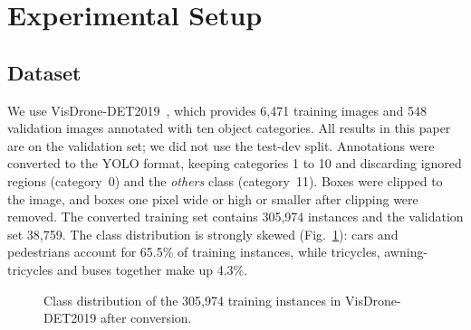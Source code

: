 \documentclass[preprint,12pt]{elsarticle}
\begin{document}
\section{Experimental Setup}
\label{sec:setup}

\subsection{Dataset}

We use VisDrone-DET2019~\cite{visdrone2019}, which provides 6,471 training images
and 548 validation images annotated with ten object categories. All results in
this paper are on the validation set; we did not use the test-dev split.
Annotations were converted to the YOLO format, keeping categories 1 to 10 and
discarding ignored regions (category~0) and the \emph{others} class (category~11).
Boxes were clipped to the image, and boxes one pixel wide or high or smaller after
clipping were removed. The converted training set contains 305,974 instances and
the validation set 38,759. The class distribution is strongly skewed
(Fig.~\ref{fig:classes}): cars and pedestrians account for 65.5\% of training
instances, while tricycles, awning-tricycles and buses together make up 4.3\%.

\begin{figure}[t]
\centering
{}
\caption{Class distribution of the 305,974 training instances in VisDrone-DET2019
after conversion.}
\label{fig:classes}
\end{figure}
\end{document}
